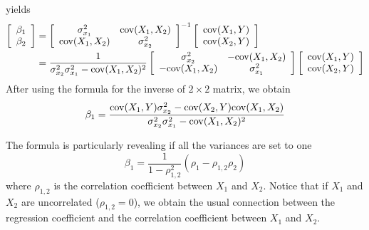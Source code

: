 yields 
\begin{align*}
\left[\begin{array}{c}
\beta_1 \\
\beta_2 
\end{array}\right] &= \left[\begin{array}{cc}
\sigma_{x_1}^2 & {\rm cov}(X_1,X_2)\\
 {\rm cov}(X_1,X_2) & \sigma_{x_2}^2
 \end{array} \right]^{-1}\left[ \begin{array}{c}
 {\rm cov}(X_1,Y)\\
  {\rm cov}(X_2,Y)\\
  \end{array}\right]\\
  &=  \frac{1}{\sigma_{x_2}^2\sigma_{x_1}^2 -{\rm cov}(X_1,X_2)^2} \left[\begin{array}{cc}
\sigma_{x_2}^2 & -{\rm cov}(X_1,X_2)\\
- {\rm cov}(X_1,X_2) & \sigma_{x_1}^2
 \end{array} \right]\left[ \begin{array}{c}
 {\rm cov}(X_1,Y)\\
  {\rm cov}(X_2,Y)\\
  \end{array}\right]
\end{align*}
After using the formula for the inverse of $2\times 2$ matrix, we obtain 
\begin{align}\label{eq:beta1cov}
\beta_1 =     \frac{ {\rm cov}(X_1,Y)\sigma_{x_2}^2 - {\rm cov}(X_2,Y){\rm cov}(X_1,X_2)}{\sigma_{x_2}^2\sigma_{x_1}^2 -{\rm cov}(X_1,X_2)^2}
\end{align}

The formula is particularly revealing if all the variances are set to one
\begin{equation*}
\beta_1 = \frac{1}{1-\rho_{1,2}^2}(\rho_1 - \rho_{1,2}\rho_2)
\end{equation*}
where $\rho_{1,2}$ is the correlation coefficient between $X_1$ and $X_2$. Notice that if $X_1$ and $X_2$ are uncorrelated ($\rho_{1,2}=0$), we obtain the usual connection between the regression coefficient and the correlation coefficient between $X_1$ and $X_2$. 

